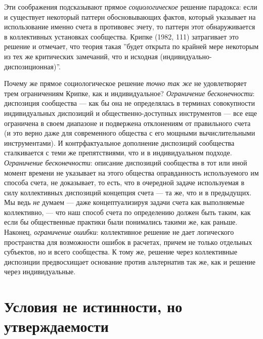 \documentclass[11pt]{book}
\begin{document}
Эти соображения подсказывают прямое \textit{социологическое} решение парадокса: если и существует некоторый паттерн обосновывающих фактов, который указывает на использование именно счета в противовес зчету, то паттерн этот обнаруживается в коллективных установках сообщества. Крипке (1982, 111) затрагивает это решение и отмечает, что теория такая ''будет открыта по крайней мере некоторым из тех же критических замечаний, что и исходная (индивидуально-диспозиционная)''.

Почему же прямое социологическое решение \textit{точно так же} не удовлетворяет трем ограничениям Крипке, как и индивидуальное? \textit{Ограничение бесконечности}: диспозиция сообщества --- как бы она не определялась в терминах совокупности индивидуальных диспозиций и общественно-доступных инструментов --- все еще ограничена в своем диапазоне и подвержена отклонениям от правильного счета (и это верно даже для современного общества с его мощными вычислительными инструментами). И контрфактуальное дополнение диспозиций сообщества сталкивается с теми же препятствиями, что и в индивидуальном подходе. \textit{Ограничение бесконечности}: описание диспозиций сообщества в тот или иной момент времени не указывает на этого общества оправданность используемого им способа счета, не доказывает, то есть, что в очередной задаче используемая в силу коллективных диспозиций концепция счета --- та же, что и в предыдущих. Мы ведь \textit{не} думаем --- даже концептуализируя задачи счета как выполняемые коллективно, --- что наш способ счета по определению должен быть таким, как если бы общественные практики были понимались такими же, как раньше. Наконец, \textit{ограничение ошибки}: коллективное решение не дает логического пространства для возможности ошибок в расчетах, причем не только отдельных субъектов, но и всего сообщества. К тому же, решение через коллективные диспозиции предвосхищает основание против альтернатив так же, как и решение через индивидуальные.

\section{Условия не истинности, но утверждаемости}
\end{document}
